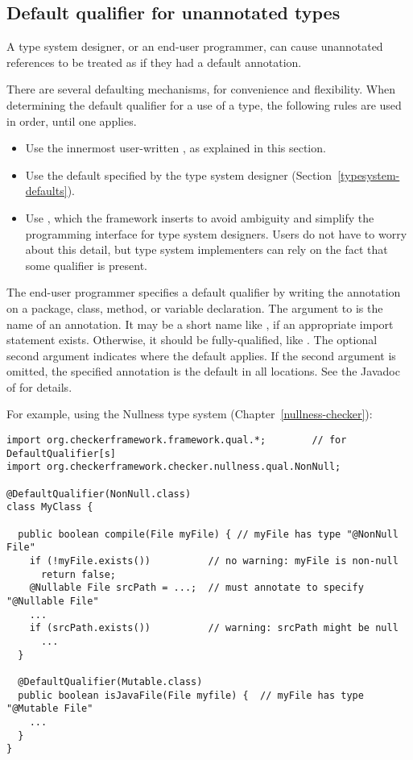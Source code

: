 \subsection{Default qualifier for unannotated types\label{defaults}}

A type system designer, or an end-user programmer, can cause unannotated
references to be treated as if they had a default annotation.

There are several defaulting mechanisms, for convenience and flexibility.
When determining the default qualifier for a use of a type, the following
rules are used in order, until one applies.
\begin{itemize}
\item
  Use the innermost user-written , as explained in
  this section.
\item
  Use the default specified by the type system designer
  (Section~\ref{typesystem-defaults}).
\item
  Use , which the framework
  inserts to avoid ambiguity and simplify the programming interface for
  type system designers.  Users do not have to worry about this detail,
  but type system implementers can rely on the fact that some
  qualifier is present.
\end{itemize}



The end-user programmer specifies a default qualifier by writing the 
annotation on a package, class, method, or variable declaration.  The
argument to  is the 
name of an annotation.  It may be a short name like , if an
appropriate import statement exists.  Otherwise, it should be
fully-qualified, like .
The optional second argument indicates where the default
applies.  If the second argument is omitted, the specified annotation is
the default in all locations.  See the Javadoc of  for details.

For example, using the Nullness type system (Chapter~\ref{nullness-checker}):

\begin{Verbatim}
import org.checkerframework.framework.qual.*;        // for DefaultQualifier[s]
import org.checkerframework.checker.nullness.qual.NonNull;

@DefaultQualifier(NonNull.class)
class MyClass {

  public boolean compile(File myFile) { // myFile has type "@NonNull File"
    if (!myFile.exists())          // no warning: myFile is non-null
      return false;
    @Nullable File srcPath = ...;  // must annotate to specify "@Nullable File"
    ...
    if (srcPath.exists())          // warning: srcPath might be null
      ...
  }

  @DefaultQualifier(Mutable.class)
  public boolean isJavaFile(File myfile) {  // myFile has type "@Mutable File"
    ...
  }
}
\end{Verbatim}

